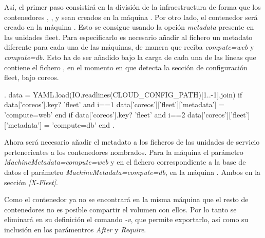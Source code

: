 Así, el primer paso consistirá en la división de la infraestructura de forma que los contenedores , ,  y  sean creados en la máquina . Por otro lado, el contenedor  será creado en la máquina . Esto se consigue usando la opción \textit{metadata} presente en las unidades fleet. Para especificarlo es necesario añadir al fichero  un metadato diferente para cada una de las máquinas, de manera que  reciba \textit{compute=web} y  \textit{compute=db}. Esto ha de ser añadido bajo la carga de cada una de las líneas que contiene el fichero , en el momento en que detecta la sección de configuración fleet, bajo coreos.

\begin{codelisting}
\label{code:vagrantfile2}
\begin{code}
.
data = YAML.load(IO.readlines(CLOUD_CONFIG_PATH)[1..-1].join)
if data['coreos'].key? 'fleet' and i==1
  data['coreos']['fleet']['metadata'] = 'compute=web'
end
if data['coreos'].key? 'fleet' and i==2
 data['coreos']['fleet']['metadata'] = 'compute=db'
end
.
\end{code}
\end{codelisting}

Ahora será necesario añadir el metadato a los ficheros de las unidades de servicio pertenecientes a los contenedores nombrados. Para la máquina  el parámetro \textit{MachineMetadata=compute=web} y en el fichero correspondiente a la base de datos el parámetro \textit{MachineMetadata=compute=db}, en la máquina . Ambos en la sección \textit{[X-Fleet]}.

Como el contenedor  ya no se encontrará en la misma máquina que el resto de contenedores no es posible compartir el volumen  con ellos. Por lo tanto se eliminará en su definición el comando \textit{-v}, que permite exportarlo, así como su inclusión en los parámentros \textit{After} y \textit{Require}.

